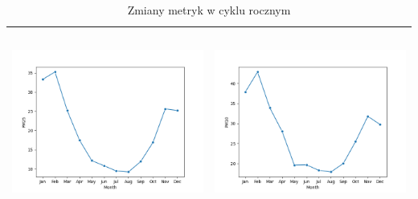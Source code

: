 \documentclass[18pt, letterpaper]{article}
\begin{document}
\begin{table}[H]
\begin{tabular}{|c|c|}
\includegraphics[width=80mm,height=60mm]{visualisations/cycles/monthly_PM25.png}  & \includegraphics[width=80mm,height=60mm]{visualisations/cycles/monthly_PM10.png} \\ \hline
\end{tabular}
\caption{Zmiany metryk w cyklu rocznym}
\label{table:yearly}
\end{table}
\end{document}
